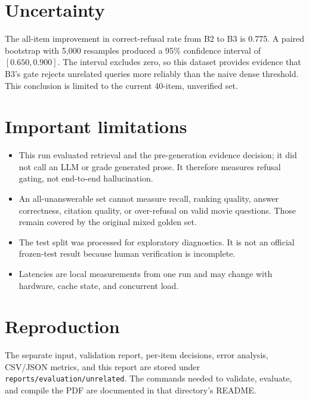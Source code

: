 \documentclass[11pt]{article}
\begin{document}
\section{Uncertainty}

The all-item improvement in correct-refusal rate from B2 to B3 is 0.775.
A paired bootstrap with 5,000 resamples produced a 95\% confidence interval
of $[0.650, 0.900]$. The interval excludes zero, so this dataset provides
evidence that B3's gate rejects unrelated queries more reliably than the
naive dense threshold. This conclusion is limited to the current 40-item,
unverified set.

\section{Important limitations}

\begin{itemize}
  \item This run evaluated retrieval and the pre-generation evidence decision;
        it did not call an LLM or grade generated prose. It therefore measures
        refusal gating, not end-to-end hallucination.
  \item An all-unanswerable set cannot measure recall, ranking quality,
        answer correctness, citation quality, or over-refusal on valid movie
        questions. Those remain covered by the original mixed golden set.
  \item The test split was processed for exploratory diagnostics. It is not an
        official frozen-test result because human verification is incomplete.
  \item Latencies are local measurements from one run and may change with
        hardware, cache state, and concurrent load.
\end{itemize}

\section{Reproduction}

The separate input, validation report, per-item decisions, error analysis,
CSV/JSON metrics, and this report are stored under
\texttt{reports/evaluation/unrelated}. The commands needed to validate,
evaluate, and compile the PDF are documented in that directory's README.
\end{document}
